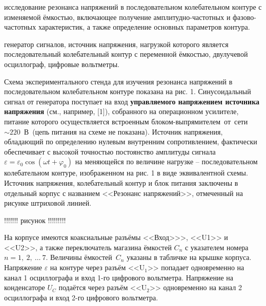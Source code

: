 
\begin{lab:aim}
     исследование резонанса напряжений в последовательном колебательном контуре с изменяемой ёмкостью, включающее получение амплитудно-частотных и фазово-частотных характеристик, а также определение основных параметров контура.
\end{lab:aim}

\begin{lab:equipment}
	генератор сигналов, источник напряжения, нагрузкой которого является последовательный колебательный контур с переменной ёмкостью, двулучевой осциллограф, цифровые вольтметры.
\end{lab:equipment}


Схема экспериментального стенда для изучения резонанса напряжений в последовательном колебательном контуре показана на рис. 1. Синусоидальный сигнал от генератора поступает на вход \textbf{управляемого напряжением источника напряжения} (см., например, [1]), собранного на операционном усилителе, питание которого осуществляется встроенным блоком-выпрямителем~от~сети  $\sim220$~В~(цепь питания на схеме не показана). Источник напряжения, об\-ла\-да\-ющий по определению нулевым внутренним сопротивлением, фактически обеспечивает с высокой точностью постоянство амплитуды сигнала~$\varepsilon=\varepsilon_0\cos(\omega t+\varphi_0)$ на меняющейся по величине нагрузке – последовательном колебательном контуре, изображенном на рис. 1 в виде эквивалентной схемы. Источник напряжения, колебательный контур и блок питания заключены в отдельный корпус с названием <<Резонанс напряжений>>, отмеченный на рисунке штриховой линией.

!!!!!!!
рисунок
!!!!!!!!!

На корпусе имеются коаксиальные разъёмы <<Вход>>>, <<U1>> и <<U2>>, а также переключатель магазина ёмкостей $C_n$ с указателем номера $n=1,~2,~\ldots~7.$ Величины ёмкостей~$C_n$ указаны в табличке на крышке корпуса. Напряжение $\varepsilon$ на контуре через разъём <<$\text{U}_1$>> попадает одно\-временно на канал 1 осциллографа и вход 1-го цифрового вольтметра. Напряжение на кон\-денсаторе $U_C$ подаётся через разъём <<$\text{U}_2$>> одновременно на канал 2 осциллографа и вход 2-го цифрового вольтметра.

